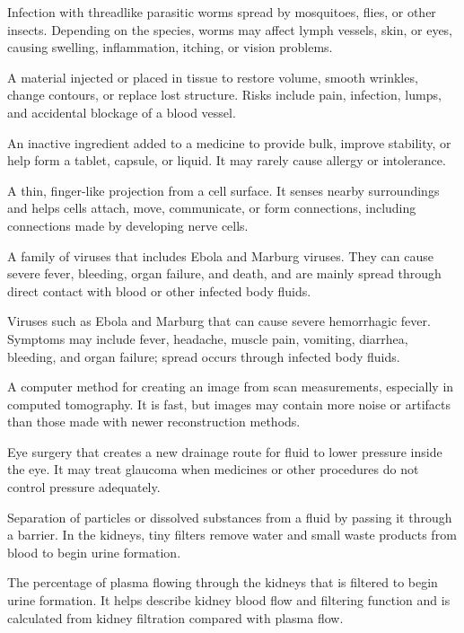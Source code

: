  Infection with threadlike parasitic worms spread by mosquitoes, flies, or other insects. Depending on the species, worms may affect lymph vessels, skin, or eyes, causing swelling, inflammation, itching, or vision problems.

 A material injected or placed in tissue to restore volume, smooth wrinkles, change contours, or replace lost structure. Risks include pain, infection, lumps, and accidental blockage of a blood vessel.

 An inactive ingredient added to a medicine to provide bulk, improve stability, or help form a tablet, capsule, or liquid. It may rarely cause allergy or intolerance.

 A thin, finger-like projection from a cell surface. It senses nearby surroundings and helps cells attach, move, communicate, or form connections, including connections made by developing nerve cells.

 A family of viruses that includes Ebola and Marburg viruses. They can cause severe fever, bleeding, organ failure, and death, and are mainly spread through direct contact with blood or other infected body fluids.

 Viruses such as Ebola and Marburg that can cause severe hemorrhagic fever. Symptoms may include fever, headache, muscle pain, vomiting, diarrhea, bleeding, and organ failure; spread occurs through infected body fluids.

 A computer method for creating an image from scan measurements, especially in computed tomography. It is fast, but images may contain more noise or artifacts than those made with newer reconstruction methods.

 Eye surgery that creates a new drainage route for fluid to lower pressure inside the eye. It may treat glaucoma when medicines or other procedures do not control pressure adequately.

 Separation of particles or dissolved substances from a fluid by passing it through a barrier. In the kidneys, tiny filters remove water and small waste products from blood to begin urine formation.

 The percentage of plasma flowing through the kidneys that is filtered to begin urine formation. It helps describe kidney blood flow and filtering function and is calculated from kidney filtration compared with plasma flow.

